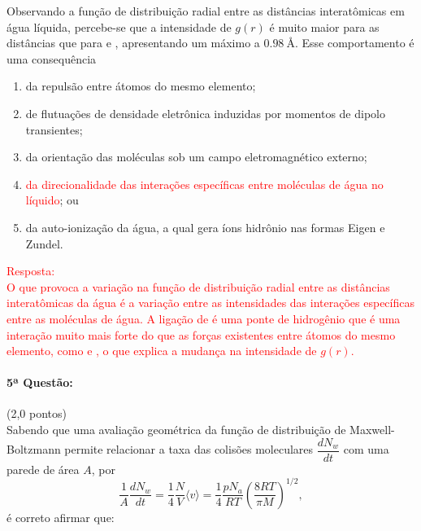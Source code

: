 \documentclass[12pt,a4paper]{article}
\begin{document}
Observando a função de distribuição radial entre as distâncias interatômicas em água líquida, percebe-se que a intensidade de $g(r)$ é muito maior para as 
distâncias  que para  e , apresentando um máximo a $\SI{0,98}{ \angstrom}$. Esse comportamento é uma consequência

\begin{enumerate}[label = (\alph*)]
    \item da repulsão entre átomos do mesmo elemento;
    \item de flutuações de densidade eletrônica induzidas por momentos de dipolo transientes;
    \item da orientação das moléculas sob um campo eletromagnético externo;
    \item \textcolor{red}{da direcionalidade das interações específicas entre moléculas de água no líquido}; ou
    \item da auto-ionização da água, a qual gera íons hidrônio nas formas Eigen e Zundel. \\ 
    
\end{enumerate}

\textcolor{red}{Resposta: \\
O que provoca a variação na função de distribuição radial entre as distâncias interatômicas da água é a variação entre as intensidades das interações específicas entre as moléculas de água. A ligação de  é uma ponte de hidrogênio que é uma interação muito mais forte do que as forças existentes entre átomos do mesmo elemento, como  e , o que explica a mudança na intensidade de $g(r)$. } \\[0.5cm]

\newpage

\paragraph{5ª Questão:} (2,0 pontos)\\ [0.5cm]

Sabendo que uma avaliação geométrica da função de distribuição de Maxwell-Boltzmann permite relacionar a taxa das colisões moleculares $\dfrac{dN_{w}}{dt}$ com uma parede de área $A$, por
\begin{equation*}
    \dfrac{1}{A} \dfrac{dN_{w}}{dt} = \dfrac{1}{4} \dfrac{N}{V} \langle v \rangle = \dfrac{1}{4} \dfrac{pN_{a}}{RT} \left( \dfrac{8RT}{\pi M} \right)^{1/2},
\end{equation*} é correto afirmar que:
\end{document}
